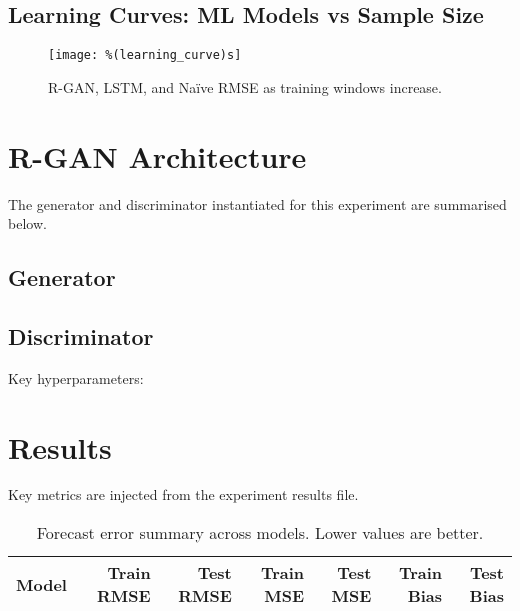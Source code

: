 \documentclass[11pt]{article}
\begin{document}
\subsection{Learning Curves: ML Models vs Sample Size}
\begin{figure}[h]
\centering
\texttt{[image: \%(learning\_curve)s]}
\caption{R-GAN, LSTM, and Naïve RMSE as training windows increase.}
\end{figure}

\section{R-GAN Architecture}
The generator and discriminator instantiated for this experiment are summarised below.

\subsection{Generator}
\begin{itemize}
\end{itemize}

\subsection{Discriminator}
\begin{itemize}
\end{itemize}

Key hyperparameters: %

\section{Results}
Key metrics are injected from the experiment results file.

\begin{table}[h]
\centering
\begin{tabular}{lrrrrrr}
\toprule
Model & Train RMSE & Test RMSE & Train MSE & Test MSE & Train Bias & Test Bias \\
\midrule
\bottomrule
\end{tabular}
\caption{Forecast error summary across models. Lower values are better.}
\end{table}
\end{document}
